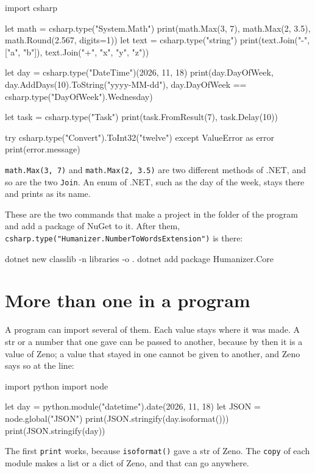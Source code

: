 \begin{zeno}[file=methods.zeno, dir=csharp]
import csharp

let math = csharp.type("System.Math")
print(math.Max(3, 7), math.Max(2, 3.5), math.Round(2.567, digits=1))
let text = csharp.type("string")
print(text.Join("-", ["a", "b"]), text.Join("+", "x", "y", "z"))

let day = csharp.type("DateTime")(2026, 11, 18)
print(day.DayOfWeek, day.AddDays(10).ToString("yyyy-MM-dd"), day.DayOfWeek == csharp.type("DayOfWeek").Wednesday)

let task = csharp.type("Task")
print(task.FromResult(7), task.Delay(10))

try {
    csharp.type("Convert").ToInt32("twelve")
} except ValueError as error {
    print(error.message)
}
\end{zeno}

\verb|math.Max(3, 7)| and \verb|math.Max(2, 3.5)| are two different
methods of .NET, and so are the two \verb|Join|. An enum of .NET, such
as the day of the week, stays there and prints as its name.

These are the two commands that make a project in the folder of the
program and add a package of NuGet to it. After them,
\verb|csharp.type("Humanizer.NumberToWordsExtension")| is there:

\begin{zenofrag}[lang=shell]
dotnet new classlib -n libraries -o .
dotnet add package Humanizer.Core
\end{zenofrag}

\section{More than one in a program}

A program can import several of them. Each value stays where it was made. A
str or a number that one gave can be passed to another, because by
then it is a value of Zeno; a value that stayed in one cannot be given
to another, and Zeno says so at the line:

\begin{zeno}[file=both.zeno, fails=yes]
import python
import node

let day = python.module("datetime").date(2026, 11, 18)
let JSON = node.global("JSON")
print(JSON.stringify(day.isoformat()))
print(JSON.stringify(day))
\end{zeno}

The first \verb|print| works, because \verb|isoformat()| gave a str of
Zeno. The \verb|copy| of each module makes a list or a dict of Zeno,
and that can go anywhere.

